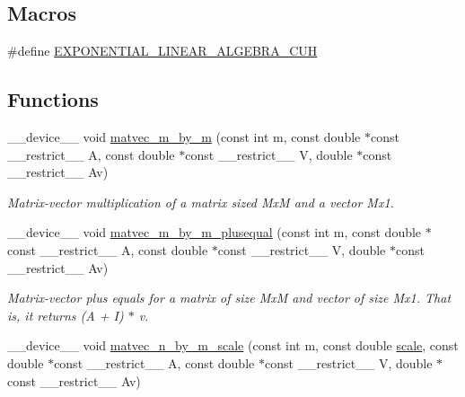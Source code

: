 \subsection*{Macros}
\begin{DoxyCompactItemize}
\item 
\#define \hyperlink{exponential__linear__algebra_8cuh_a681edd700cfabbc96d9bafca7cc69049}{E\+X\+P\+O\+N\+E\+N\+T\+I\+A\+L\+\_\+\+L\+I\+N\+E\+A\+R\+\_\+\+A\+L\+G\+E\+B\+R\+A\+\_\+\+C\+UH}
\end{DoxyCompactItemize}
\subsection*{Functions}
\begin{DoxyCompactItemize}
\item 
\+\_\+\+\_\+device\+\_\+\+\_\+ void \hyperlink{exponential__linear__algebra_8cuh_a2e59348b99908b5918de88097e15d5ff}{matvec\+\_\+m\+\_\+by\+\_\+m} (const int m, const double $\ast$const \+\_\+\+\_\+restrict\+\_\+\+\_\+ A, const double $\ast$const \+\_\+\+\_\+restrict\+\_\+\+\_\+ V, double $\ast$const \+\_\+\+\_\+restrict\+\_\+\+\_\+ Av)
\begin{DoxyCompactList}\small\item\em Matrix-\/vector multiplication of a matrix sized MxM and a vector Mx1. \end{DoxyCompactList}\item 
\+\_\+\+\_\+device\+\_\+\+\_\+ void \hyperlink{exponential__linear__algebra_8cuh_a6bc7e5c08b8e40b19ce05ea146c05307}{matvec\+\_\+m\+\_\+by\+\_\+m\+\_\+plusequal} (const int m, const double $\ast$const \+\_\+\+\_\+restrict\+\_\+\+\_\+ A, const double $\ast$const \+\_\+\+\_\+restrict\+\_\+\+\_\+ V, double $\ast$const \+\_\+\+\_\+restrict\+\_\+\+\_\+ Av)
\begin{DoxyCompactList}\small\item\em Matrix-\/vector plus equals for a matrix of size MxM and vector of size Mx1. That is, it returns (A + I) $\ast$ v. \end{DoxyCompactList}\item 
\+\_\+\+\_\+device\+\_\+\+\_\+ void \hyperlink{exponential__linear__algebra_8cuh_a03e37312683db492dc73e08c17fe40e7}{matvec\+\_\+n\+\_\+by\+\_\+m\+\_\+scale} (const int m, const double \hyperlink{inverse_8cu_adbb4f3f3af5f968a94f717729803c88d}{scale}, const double $\ast$const \+\_\+\+\_\+restrict\+\_\+\+\_\+ A, const double $\ast$const \+\_\+\+\_\+restrict\+\_\+\+\_\+ V, double $\ast$const \+\_\+\+\_\+restrict\+\_\+\+\_\+ Av)

\end{DoxyCompactItemize}
